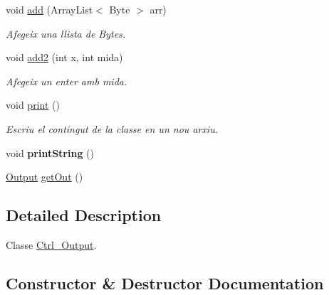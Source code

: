 \begin{DoxyCompactItemize}
void \hyperlink{classpersistencia_1_1output_1_1Ctrl__Output_a5fb2f07198a77b4fac0f95ee48e3d0b9}{add} (Array\+List$<$ Byte $>$ arr)
\begin{DoxyCompactList}\small\item\em Afegeix una llista de Bytes. \end{DoxyCompactList}\item 
void \hyperlink{classpersistencia_1_1output_1_1Ctrl__Output_ad4738467c2312b0e079c14003e548dd6}{add2} (int x, int mida)
\begin{DoxyCompactList}\small\item\em Afegeix un enter amb mida. \end{DoxyCompactList}\item 
\mbox{\label{classpersistencia_1_1output_1_1Ctrl__Output_a908955c29bfecc7ebac86613bc75e9ed}} 
void \hyperlink{classpersistencia_1_1output_1_1Ctrl__Output_a908955c29bfecc7ebac86613bc75e9ed}{print} ()
\begin{DoxyCompactList}\small\item\em Escriu el contingut de la classe en un nou arxiu. \end{DoxyCompactList}\item 
\mbox{\label{classpersistencia_1_1output_1_1Ctrl__Output_a4536ad32e96d0270655a21c7c84f3bdd}} 
void {\bfseries print\+String} ()
\item 
\hyperlink{classpersistencia_1_1output_1_1Output}{Output} \hyperlink{classpersistencia_1_1output_1_1Ctrl__Output_aa36fdf4d9efc14d95f5d0d77838c6280}{get\+Out} ()
\end{DoxyCompactItemize}


\subsection{Detailed Description}
Classe \hyperlink{classpersistencia_1_1output_1_1Ctrl__Output}{Ctrl\+\_\+\+Output}. 

\subsection{Constructor \& Destructor Documentation}
\mbox{\label{classpersistencia_1_1output_1_1Ctrl__Output_afeb28ec6172b522bf6bdaf16238d622b}} 
